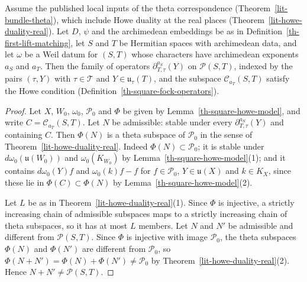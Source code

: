 \begin{lemma}\label{th-square-howe-condition}
Assume the published local inputs of the theta correspondence
(Theorem~\ref{lit-bundle-theta}), which include Howe duality at the real places
(Theorem~\ref{lit-howe-duality-real}). Let $D$, $\psi$ and the archimedean
embeddings be as in Definition~\ref{th-first-lift-matching}, let $S$ and $T$ be
Hermitian spaces with archimedean data, and let $\omega$ be a Weil datum for
$(S,T)$ whose characters have archimedean exponents $a_S$ and $a_T$. Then the
family of operators $\partial^{a_S}_{T,\tau}(Y)$ on $\mathcal P(S,T)$, indexed
by the pairs $(\tau,Y)$ with $\tau\in\mathcal T$ and
$Y\in\mathfrak u_\tau(T)$, and the subspace $\mathcal C_{a_T}(S,T)$ satisfy
the Howe condition (Definition~\ref{th-square-fock-operators}).
\end{lemma}
\begin{proof}
Let $X$, $W_0$, $\omega_0$, $\mathcal P_0$ and $\Phi$ be given by
Lemma~\ref{th-square-howe-model}, and write $C=\mathcal C_{a_T}(S,T)$. Let $N$
be admissible: stable under every $\partial^{a_S}_{T,\tau}(Y)$ and containing
$C$. Then $\Phi(N)$ is a theta subspace of $\mathcal P_0$ in the sense of
Theorem~\ref{lit-howe-duality-real}. Indeed $\Phi(N)\subset\mathcal P_0$; it
is stable under $d\omega_0(\mathfrak u(W_0))$ and $\omega_0(K_{W_0})$ by
Lemma~\ref{th-square-howe-model}(1); and it contains $d\omega_0(Y)f$ and
$\omega_0(k)f-f$ for $f\in\mathcal P_0$, $Y\in\mathfrak u(X)$ and $k\in K_X$,
since these lie in $\Phi(C)\subset\Phi(N)$ by
Lemma~\ref{th-square-howe-model}(2).

Let $L$ be as in Theorem~\ref{lit-howe-duality-real}(1). Since $\Phi$ is
injective, a strictly increasing chain of admissible subspaces maps to a
strictly increasing chain of theta subspaces, so it has at most $L$ members.
Let $N$ and $N'$ be admissible and different from $\mathcal P(S,T)$. Since
$\Phi$ is injective with image $\mathcal P_0$, the theta subspaces $\Phi(N)$
and $\Phi(N')$ are different from $\mathcal P_0$, so
$\Phi(N+N')=\Phi(N)+\Phi(N')\neq\mathcal P_0$ by
Theorem~\ref{lit-howe-duality-real}(2). Hence
$N+N'\neq\mathcal P(S,T)$.
\end{proof}

